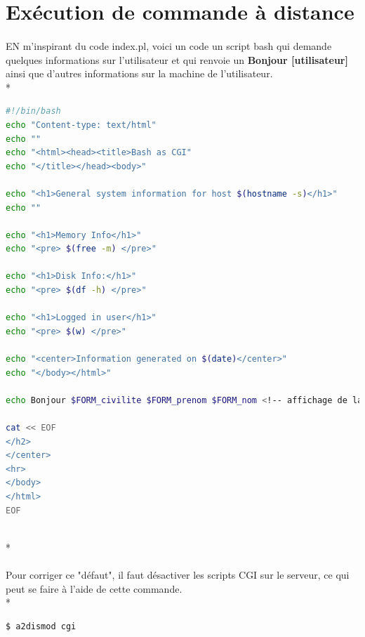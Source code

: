 \documentclass{article}
\begin{document}

\section{Exécution de commande à distance}

\paragraph{}
EN m'inspirant du code index.pl, voici un code un script bash qui demande quelques informations sur l'utilisateur et qui renvoie un \textbf{Bonjour [utilisateur]} ainsi que d'autres informations sur la machine de l'utilisateur. \\*
\begin{tcolorbox}
\begin{lstlisting}[language=sh]
#!/bin/bash
echo "Content-type: text/html"
echo ""
echo "<html><head><title>Bash as CGI"
echo "</title></head><body>"

echo "<h1>General system information for host $(hostname -s)</h1>"
echo ""

echo "<h1>Memory Info</h1>"
echo "<pre> $(free -m) </pre>"

echo "<h1>Disk Info:</h1>"
echo "<pre> $(df -h) </pre>"

echo "<h1>Logged in user</h1>"
echo "<pre> $(w) </pre>"

echo "<center>Information generated on $(date)</center>"
echo "</body></html>"

echo Bonjour $FORM_civilite $FORM_prenom $FORM_nom <!-- affichage de la civilité, du prenom et du nom de la personne -->

cat << EOF
</h2>
</center>
<hr>
</body>
</html>
EOF
\end{lstlisting}
\end{tcolorbox}
~\\*
\paragraph{}
Pour corriger ce "défaut", il faut désactiver les scripts CGI sur le serveur, ce qui peut se faire à l'aide de cette commande.\\*
\begin{tcolorbox}
\begin{lstlisting}[language=sh]
$ a2dismod cgi
\end{lstlisting}
\end{tcolorbox}
\end{document}
